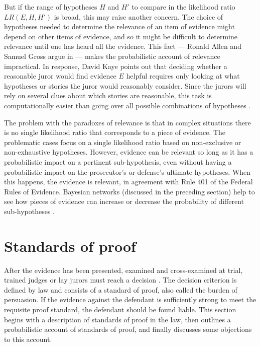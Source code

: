 \documentclass{article}
\begin{document}
But if the range of  hypotheses $H$ and $H'$ to compare in the likelihood ratio $LR(E, H, H')$ is broad, 
this may raise another concern. The choice of hypotheses  needed to determine the relevance of an  item of evidence might depend on other items of evidence, and so it might be  difficult to determine relevance until one has heard all the evidence.  This fact --- Ronald Allen and Samuel Gross argue in \citep{park2010BayesWarsRedivivus} ---  makes the probabilistic account of relevance impractical.  In response, David Kaye points out that deciding whether a reasonable juror would find  evidence $E$  helpful requires only looking at what hypotheses or stories the juror would reasonably consider. Since the jurors will rely on several clues about which stories are reasonable, this task is computationally easier than going over all possible combinations of  hypotheses \citep{park2010BayesWarsRedivivus}. 




\noindent

The problem with the  paradoxes of relevance is that in complex situations there is no single likelihood ratio that corresponds to a piece of evidence. The problematic cases focus on a single likelihood ratio based on non-exclusive or non-exhaustive hypotheses.  However, evidence can be relevant so long as it has a probabilistic impact on a  pertinent sub-hypothesis,  even without having a probabilistic impact on the prosecutor's or defense's ultimate hypotheses. When this happens, the evidence is relevant, in agreement with Rule 401 of the Federal Rules of Evidence. Bayesian networks (discussed in the preceding section) help to see how pieces of evidence can increase or decrease the probability of different sub-hypotheses  \citep[for more details, see][]{dezoete2019ResolvingSocalledProbabilistic}. 
















\section{Standards of proof}
\label{sec:burden}

After the evidence has been presented, examined and cross-examined at trial,  trained judges or lay jurors must reach a decision \citep[see][for a few caveats on what the decision should be about]{Laudan2010verdicts}.
The decision criterion is defined by law 
and consists of a standard of proof, also called the burden of persuasion. 
If the evidence against the defendant is sufficiently strong to meet the requisite proof standard, the defendant should be found liable. This section begins with a description of standards of proof in the law, then outlines a probabilistic account of standards of proof, and finally discusses some objections to this account. 
\end{document}
